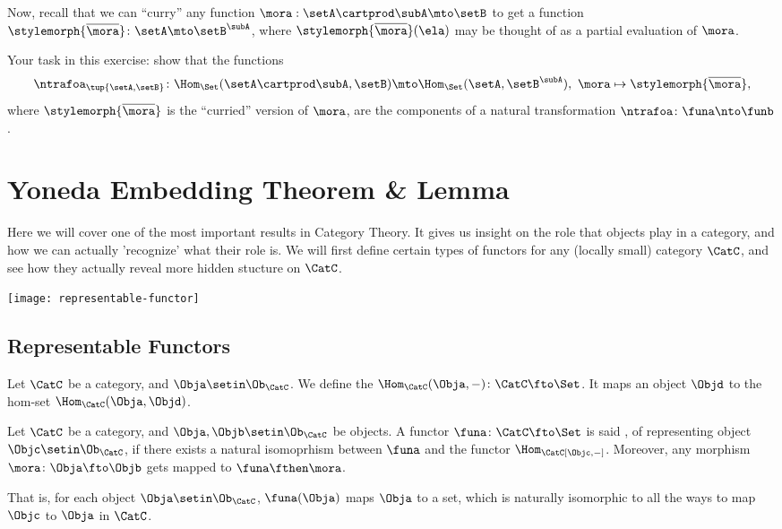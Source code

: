\begin{gradedexercise}
    Now, recall that we can ``curry'' any function $\mora : \setA \cartprod \subA \mto \setB$ to get a function $\stylemorph{\overline{{\mora}}} \colon \setA \mto \setB^\subA$, where $\stylemorph{\overline{{\mora}}}(\ela)$ may be thought of as a partial evaluation of $\mora$.

    Your task in this exercise: show that the functions
    \begin{equation}
        \ntrafoa_{\tup{\setA, \setB}} \colon \Hom_\Set(\setA \cartprod \subA, \setB) \mto \Hom_\Set(\setA, \setB^\subA), \ \mora \mapsto \stylemorph{\overline{{\mora}}},
    \end{equation}
    where $\stylemorph{\overline{{\mora}}}$ is the ``curried'' version of $\mora$, are the components of a natural transformation $\ntrafoa \colon \funa \nto \funb$.
\end{gradedexercise}


\section{Yoneda Embedding Theorem \& Lemma}
Here we will cover one of the most important results in Category Theory. It gives us insight on the role that objects play 
in a category, and how we can actually 'recognize' what their role is. We will first define certain types of functors for any (locally small) category $\CatC$, and see how they actually reveal more hidden stucture on $\CatC$.

\begin{marginfigure}
\centering
\texttt{[image: representable-functor]}
\label{fig:representable-functor}
\end{marginfigure}

\subsection{Representable Functors}
\begin{ctdefinition}
Let $\CatC$ be a category, and $\Obja \setin \Ob_\CatC$. We define the  $\Hom_\CatC(\Obja, -)\colon\CatC\fto\Set$. It maps an object $\Objd$ to the hom-set $\Hom_\CatC(\Obja, \Objd)$.
\end{ctdefinition}

\begin{ctdefinition}
Let $\CatC$ be a category, and $\Obja, \Objb \setin \Ob_\CatC$ be objects. A functor $\funa\colon\CatC \fto \Set$ is said , of representing object $\Objc\setin\Ob_\CatC$, if there exists a natural isomoprhism between $\funa$ and the functor $\Hom_\CatC[\Objc, -]$. Moreover, any morphism $\mora\colon\Obja\fto\Objb$ gets mapped to $\funa\fthen\mora$.

That is, for each object $\Obja \setin \Ob_\CatC$, $\funa(\Obja)$ maps $\Obja$ to a set, which is naturally isomorphic to all the ways to map $\Objc$ to $\Obja$ in $\CatC$.
\end{ctdefinition}

